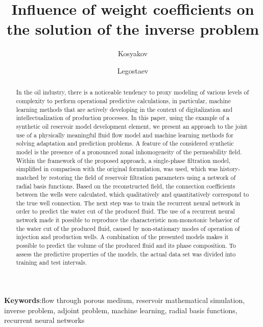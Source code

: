 \documentclass{article}
\begin{document}
\title{Influence of weight coefficients on the solution of the inverse problem} %
\author{Kosyakov} %
\author{Legostaev}




\begin{abstract} %
In the oil industry, there is a noticeable tendency to proxy modeling of various levels of complexity to perform operational predictive calculations, in particular, machine learning methods that are actively developing in the context of digitalization and intellectualization of production processes. In this paper, using the example of a synthetic oil reservoir model development element, we present an approach to the joint use of a physically meaningful fluid flow model and machine learning methods for solving adaptation and prediction problems. A feature of the considered synthetic model is the presence of a pronounced zonal inhomogeneity of the permeability field. Within the framework of the proposed approach, a single-phase filtration model, simplified in comparison with the original formulation, was used, which was history-matched by restoring the field of reservoir filtration parameters using a network of radial basis functions. Based on the reconstructed field, the connection coefficients between the wells were calculated, which qualitatively and quantitatively correspond to the true well connection. The next step was to train the recurrent neural network in order to predict the water cut of the produced fluid. The use of a recurrent neural network made it possible to reproduce the characteristic non-monotonic behavior of the water cut of the produced fluid, caused by non-stationary modes of operation of injection and production wells. A combination of the presented models makes it possible to predict the volume of the produced fluid and its phase composition. To assess the predictive properties of the models, the actual data set was divided into training and test intervals.
\end{abstract}

\textbf{Keywords}:flow through porous medium, reservoir mathematical simulation, inverse problem, adjoint problem, machine learning, radial basis functions, recurrent neural networks %
\end{document}
